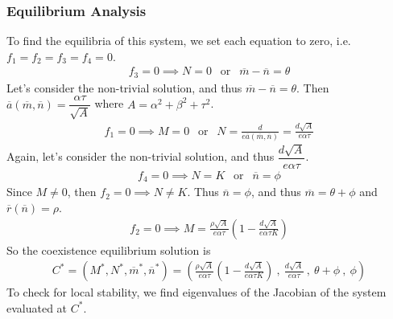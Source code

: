 \documentclass[12pt]{article}
\begin{document}
\subsubsection*{Equilibrium Analysis}
To find the equilibria of this system, we set each equation to zero, i.e. $f_1 = f_2 = f_3 = f_4 = 0$.
\begin{align*}
	f_3 = 0 \implies N = 0 \ \ \text{ or }\ \  \overline{m} - \overline{n} = \theta
\end{align*}
Let's consider the non-trivial solution, and thus $\overline{m} - \overline{n} = \theta$.  Then $\overline{a}(\overline{m}, \overline{n}) = \dfrac{\alpha\tau}{\sqrt{A}}$ where $A = \alpha^2 + \beta^2 + \tau^2$.
\begin{align*}
	f_1 = 0 \implies M = 0 \ \ \text{ or }\ \  N = \frac{d}{e\overline{a}(\overline{m}, \overline{n})} = \frac{d\sqrt{A}}{e\alpha\tau}
\end{align*}
Again, let's consider the non-trivial solution, and thus $\dfrac{d\sqrt{A}}{e\alpha\tau}$.
\begin{align*}
	f_4 = 0 \implies N = K \ \ \text{ or }\ \ \overline{n} = \phi
\end{align*}
Since $M \neq 0$, then $f_2 = 0 \implies N \neq K$.  Thus $\overline{n} = \phi$, and thus $\overline{m} = \theta + \phi$ and $\overline{r}(\overline{n}) = \rho$.
\begin{align*}
	f_2 = 0 \implies M = \frac{\rho\sqrt{A}}{e\alpha\tau}\left(1 - \frac{d\sqrt{A}}{e\alpha\tau K}\right)
\end{align*}
So the coexistence equilibrium solution is
\begin{align*}
	C^* = (M^*, N^*, \overline{m}^*, \overline{n}^*) = \left(\frac{\rho\sqrt{A}}{e\alpha\tau}\left(1 - \frac{d\sqrt{A}}{e\alpha\tau K}\right)\ ,\ \frac{d\sqrt{A}}{e\alpha\tau}\ ,\ \theta + \phi\ ,\ \phi\right)
\end{align*}
To check for local stability, we find eigenvalues of the Jacobian of the system evaluated at $C^*$.
\end{document}
